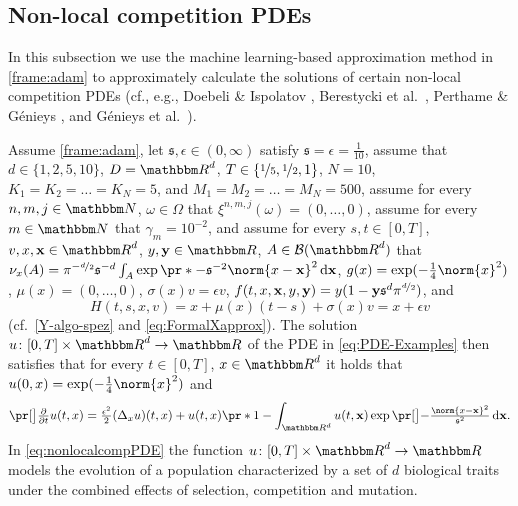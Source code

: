 \subsection{Non-local competition PDEs}
\label{subsec:nonlocalcompPDE}
%
In this subsection we use the machine learning-based approximation method in \cref{frame:adam}
to approximately calculate the solutions of certain non-local competition PDEs (cf., e.g., Doebeli \& Ispolatov \cite{Doebeli2010}, Berestycki et al.~\cite{Berestycki2009b}, Perthame \& Génieys \cite{Perthame2007}, and Génieys et al.~\cite{Genieys2006a}).
%

Assume 
	\cref{frame:adam}, 
let
	$\mathfrak s,\epsilon\in(0,\infty)$
satisfy
	$\mathfrak{s} = \epsilon =\tfrac{1}{10}$,
assume that
	$d\in\{1,2,5,10\}$,
	$\D = \R^d$,
	$T\in\{\nicefrac{1}{5},\nicefrac{1}{2},1\}$,
	$N=10$,
	$K_1 = K_2 = \ldots = K_N= 5$, and
	$M_1 = M_2 = \ldots = M_N = 500$,
assume 
	for every 
		$n,m,j\in \N$, $\omega \in \Omega$ 
	that 
		$\xi^{n,m,j}(\omega)=(0,\dots,0)$,
assume
	for every 
		$m \in \N$
	that
		$\gamma_m = 10^{-2}$,
and assume 
	for every 
		$s,t \in [0,T]$, 
		$v,x,\mathbf{x}%
		\in \R^d$, 
		$y,\mathbf{y} \in \R$,
		$A \in \mathcal{B}(\R^d)$
	that
		$\nu_x(A) = \pi^{-\nicefrac{d}{2}}\mathfrak{s}^{-d}\int_A \exp\pr*{-\mathfrak{s}^{-2}\norm{x - \mathbf{x}}^2}\,\diff\mathbf{x}$,
		$g(x)= \exp (-\tfrac{1}{4}\norm{x}^2)$,
		$\mu(x)=(0,\dots,0)$,
		$\sigma(x) v=\epsilon v$, 
		$f(t,x,\mathbf{x},y,\mathbf{y}%
		)=  y(1 - \mathbf{y} \mathfrak{s}^d\pi^{\nicefrac{d}{2}})$, and
	\begin{equation}
		\label{eq:Hcomp}
		H(t,s,x,v)
		=
		x + \mu(x)(t-s)+ \sigma(x)v
		=
		x+\epsilon v
	\end{equation}
	(cf.\ \eqref{Y-algo-spez} and \eqref{eq:FormalXapprox}).
The solution 
	$u\colon[0,T]\times \R^d \to \R$ 
	of the PDE in \eqref{eq:PDE-Examples} then satisfies that 
		for every
			$t\in [0,T]$, $x\in\R^d$ 
		it holds that 
			$u(0,x)=\exp (-\tfrac{1}{4}\norm{x}^2)$ and
		\begin{equation}
			\label{eq:nonlocalcompPDE}
 			\bpr{\tfrac{\partial}{\partial t}u}(t,x)
 			=
 			\tfrac{\epsilon^2}{2}(\Delta_x u)(t,x) + u(t,x) \pr*{1 - \int_{\R^d} u(t,\mathbf{x}) \exp \bpr{-\tfrac{\norm{x-\mathbf{x}}^2}{\mathfrak{s}^2} } \, \diff \mathbf{x} }
			.
		\end{equation}
%
%
In \eqref{eq:nonlocalcompPDE} the function $u\colon[0,T]\times\R^d\to\R$ models the evolution of a population characterized by a set of $d$ biological traits under the combined effects of selection, competition and mutation. 

